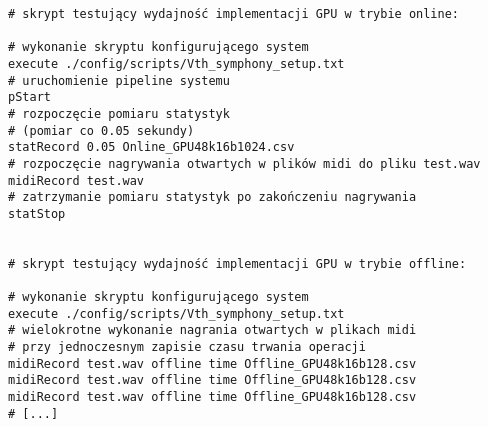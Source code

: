 \begin{lstlisting}
# skrypt testujący wydajność implementacji GPU w trybie online:

# wykonanie skryptu konfigurującego system
execute ./config/scripts/Vth_symphony_setup.txt
# uruchomienie pipeline systemu
pStart
# rozpoczęcie pomiaru statystyk 
# (pomiar co 0.05 sekundy)
statRecord 0.05 Online_GPU48k16b1024.csv
# rozpoczęcie nagrywania otwartych w plików midi do pliku test.wav
midiRecord test.wav
# zatrzymanie pomiaru statystyk po zakończeniu nagrywania 
statStop


# skrypt testujący wydajność implementacji GPU w trybie offline:

# wykonanie skryptu konfigurującego system
execute ./config/scripts/Vth_symphony_setup.txt
# wielokrotne wykonanie nagrania otwartych w plikach midi
# przy jednoczesnym zapisie czasu trwania operacji
midiRecord test.wav offline time Offline_GPU48k16b128.csv
midiRecord test.wav offline time Offline_GPU48k16b128.csv
midiRecord test.wav offline time Offline_GPU48k16b128.csv
# [...] 
\end{lstlisting}

